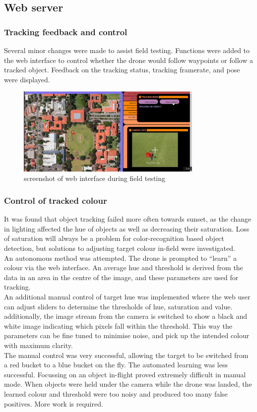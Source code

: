 \documentclass[a4paper, 12pt, titlepage]{article}
\begin{document}
	\subsection{Web server}
	\subsubsection{Tracking feedback and control}
Several minor changes were made to assist field testing. Functions were added to the web interface to control whether the drone would follow waypoints or follow a tracked object. Feedback on the tracking status, tracking framerate, and pose were displayed.
\begin{figure}[h!]
\includegraphics[width=0.8\textwidth]{webInterface.png}
\centering
\caption{screenshot of web interface during field testing}
\end{figure}


	\subsubsection{Control of tracked colour}
It was found that object tracking failed more often towards sunset, as the change in lighting affected the hue of objects as well as decreasing their saturation. Loss of saturation will always be a problem for color-recognition based object detection, but solutions to adjusting target colour in-field were investigated. 
\\An autonomous method was attempted. The drone is prompted to “learn” a colour via the web interface. An average hue and threshold is derived from the data in an area in the centre of the image, and these parameters are used for tracking. 
\\An additional manual control of target hue was implemented where the web user can adjust sliders to determine the thresholds of hue, saturation and value. additionally, the image stream from the camera is switched to show a black and white image indicating which pixels fall within the threshold. This way the parameters can be fine tuned to minimise noise, and pick up the intended colour with maximum clarity.
\\The manual control was very successful, allowing the target to be switched from a red bucket to a blue bucket on the fly.
The automated learning was less successful. Focussing on an object in-flight proved extremely difficult in manual mode. When objects were held under the camera while the drone was landed, the learned colour and threshold were too noisy and produced too many false positives. More work is required.
\end{document}
